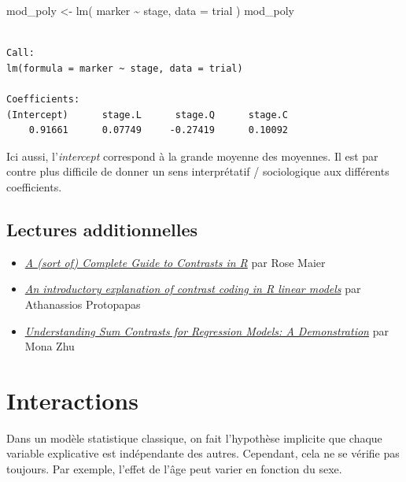 \documentclass[
  letterpaper,
  DIV=11,
  numbers=noendperiod,
  oneside]{scrreprt}
\newenvironment{Shaded}{\begin{snugshade}}{\end{snugshade}}
\newcommand{\AttributeTok}[1]{\textcolor[rgb]{0.40,0.45,0.13}{#1}}
\newcommand{\FunctionTok}[1]{\textcolor[rgb]{0.28,0.35,0.67}{#1}}
\newcommand{\NormalTok}[1]{\textcolor[rgb]{0.00,0.23,0.31}{#1}}
\newcommand{\OtherTok}[1]{\textcolor[rgb]{0.00,0.23,0.31}{#1}}
\newcommand{\SpecialCharTok}[1]{\textcolor[rgb]{0.37,0.37,0.37}{#1}}
\providecommand{\tightlist}{%
  \setlength{\itemsep}{0pt}\setlength{\parskip}{0pt}}\usepackage{longtable,booktabs,array}
\begin{document}
\begin{Shaded}
\begin{Highlighting}[]
\NormalTok{mod\_poly }\OtherTok{\textless{}{-}} \FunctionTok{lm}\NormalTok{(}
\NormalTok{  marker }\SpecialCharTok{\textasciitilde{}}\NormalTok{ stage,}
  \AttributeTok{data =}\NormalTok{ trial}
\NormalTok{)}
\NormalTok{mod\_poly}
\end{Highlighting}
\end{Shaded}

\begin{verbatim}

Call:
lm(formula = marker ~ stage, data = trial)

Coefficients:
(Intercept)      stage.L      stage.Q      stage.C  
    0.91661      0.07749     -0.27419      0.10092  
\end{verbatim}

Ici aussi, l'\emph{intercept} correspond à la grande moyenne des
moyennes. Il est par contre plus difficile de donner un sens
interprétatif / sociologique aux différents coefficients.

\hypertarget{lectures-additionnelles}{%
\section{Lectures additionnelles}\label{lectures-additionnelles}}

\begin{itemize}
\tightlist
\item
  \href{https://rstudio-pubs-static.s3.amazonaws.com/65059_586f394d8eb84f84b1baaf56ffb6b47f.html}{\emph{A
  (sort of) Complete Guide to Contrasts in R}} par Rose Maier
\item
  \href{https://rstudio-pubs-static.s3.amazonaws.com/84177_4604ecc1bae246c9926865db53b6cc29.html}{\emph{An
  introductory explanation of contrast coding in R linear models}} par
  Athanassios Protopapas
\item
  \href{https://rpubs.com/monajhzhu/608609}{\emph{Understanding Sum
  Contrasts for Regression Models: A Demonstration}} par Mona Zhu
\end{itemize}

\hypertarget{sec-interactions}{%
\chapter{Interactions}\label{sec-interactions}}

Dans un modèle statistique classique, on fait l'hypothèse implicite que
chaque variable explicative est indépendante des autres. Cependant, cela
ne se vérifie pas toujours. Par exemple, l'effet de l'âge peut varier en
fonction du sexe.
\end{document}
